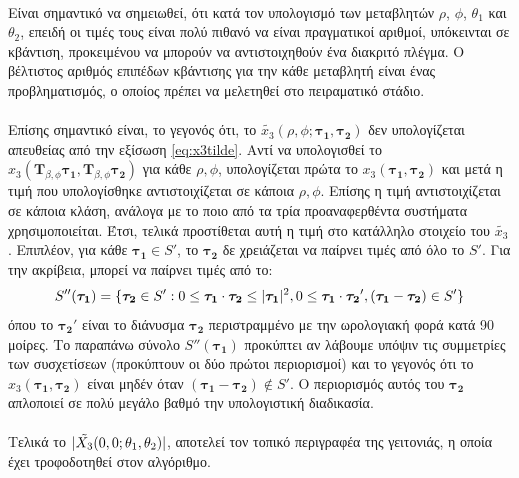 \paragraph*{}
Είναι σημαντικό να σημειωθεί, ότι κατά τον υπολογισμό των μεταβλητών $\rho$, $\phi$, $\theta_1$ και $\theta_2$, επειδή οι τιμές τους είναι πολύ πιθανό να είναι πραγματικοί αριθμοί, υπόκεινται σε κβάντιση, προκειμένου να μπορούν να αντιστοιχηθούν ένα διακριτό πλέγμα. Ο βέλτιστος αριθμός επιπέδων κβάντισης για την κάθε μεταβλητή είναι ένας προβληματισμός, ο οποίος πρέπει να μελετηθεί στο πειραματικό στάδιο.

\paragraph*{}
Επίσης σημαντικό είναι, το γεγονός ότι, το $\tilde{x_3}(\rho,\phi;\boldsymbol{\tau_1},\boldsymbol{\tau_2})$ δεν υπολογίζεται απευθείας από την εξίσωση \ref{eq:x3tilde}. Αντί να υπολογισθεί το $x_3(\textbf{T}_{\beta,\phi}\boldsymbol{\tau_1},\textbf{T}_{\beta,\phi}\boldsymbol{\tau_2})$ για κάθε $\rho,\phi$, υπολογίζεται πρώτα το $x_3(\boldsymbol{\tau_1},\boldsymbol{\tau_2})$ και μετά η τιμή που υπολογίσθηκε αντιστοιχίζεται σε κάποια $\rho,\phi$. Επίσης η τιμή αντιστοιχίζεται σε κάποια κλάση, ανάλογα με το ποιο από τα τρία προαναφερθέντα συστήματα χρησιμοποιείται. Έτσι, τελικά προστίθεται αυτή η τιμή στο κατάλληλο στοιχείο του $\tilde{x_3}$. Επιπλέον, για κάθε $\boldsymbol{\tau_1}\in S'$, το $\boldsymbol{\tau_2}$ δε χρειάζεται να παίρνει τιμές από όλο το $S'$. Για την ακρίβεια, μπορεί να παίρνει τιμές από το:
\begin{equation}
S''(\boldsymbol{\tau_1}) = \lbrace  \boldsymbol{\tau_2} \in S': 0 \leq \boldsymbol{\tau_1} \cdot \boldsymbol{\tau_2} \leq \lvert \boldsymbol{\tau_1}\rvert^2 , 0 \leq \boldsymbol{\tau_1} \cdot \boldsymbol{\tau_2}', (\boldsymbol{\tau_1}-\boldsymbol{\tau_2})\in S' \rbrace
\end{equation}
όπου το $\boldsymbol{\tau_2}'$ είναι το διάνυσμα $\boldsymbol{\tau_2}$ περιστραμμένο με την ωρολογιακή φορά κατά 90 μοίρες. Το παραπάνω σύνολο $S''(\boldsymbol{\tau_1})$ προκύπτει αν λάβουμε υπόψιν τις συμμετρίες των συσχετίσεων (προκύπτουν οι δύο πρώτοι περιορισμοί) και το γεγονός ότι το $x_3(\boldsymbol{\tau_1},\boldsymbol{\tau_2})$ είναι μηδέν όταν $(\boldsymbol{\tau_1}-\boldsymbol{\tau_2})\not\in S'$. Ο περιορισμός αυτός του $\boldsymbol{\tau_2}$ απλοποιεί σε πολύ μεγάλο βαθμό την υπολογιστική διαδικασία.

\paragraph*{}
Τελικά το $\lvert\tilde{X_3}(0,0;\theta_1,\theta_2)\rvert$, αποτελεί τον τοπικό περιγραφέα της γειτονιάς, η οποία έχει τροφοδοτηθεί στον αλγόριθμο. 

